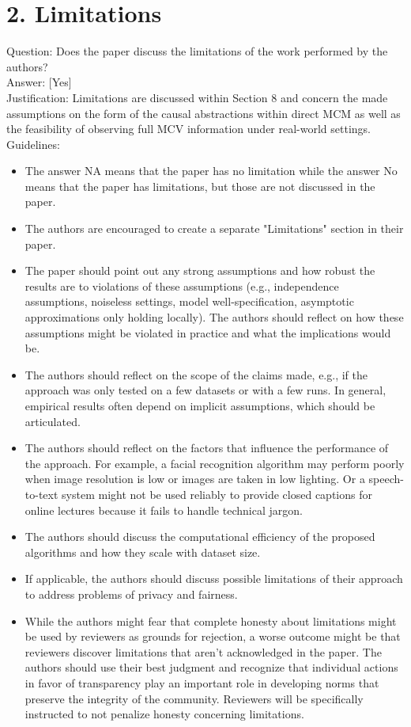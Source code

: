\documentclass[10pt]{article}
\begin{document}
\section*{2. Limitations}
Question: Does the paper discuss the limitations of the work performed by the authors?\\[0pt]
Answer: [Yes]\\
Justification: Limitations are discussed within Section 8 and concern the made assumptions on the form of the causal abstractions within direct MCM as well as the feasibility of observing full MCV information under real-world settings.\\
Guidelines:

\begin{itemize}
  \item The answer NA means that the paper has no limitation while the answer No means that the paper has limitations, but those are not discussed in the paper.
  \item The authors are encouraged to create a separate "Limitations" section in their paper.
  \item The paper should point out any strong assumptions and how robust the results are to violations of these assumptions (e.g., independence assumptions, noiseless settings, model well-specification, asymptotic approximations only holding locally). The authors should reflect on how these assumptions might be violated in practice and what the implications would be.
  \item The authors should reflect on the scope of the claims made, e.g., if the approach was only tested on a few datasets or with a few runs. In general, empirical results often depend on implicit assumptions, which should be articulated.
  \item The authors should reflect on the factors that influence the performance of the approach. For example, a facial recognition algorithm may perform poorly when image resolution is low or images are taken in low lighting. Or a speech-to-text system might not be used reliably to provide closed captions for online lectures because it fails to handle technical jargon.
  \item The authors should discuss the computational efficiency of the proposed algorithms and how they scale with dataset size.
  \item If applicable, the authors should discuss possible limitations of their approach to address problems of privacy and fairness.
  \item While the authors might fear that complete honesty about limitations might be used by reviewers as grounds for rejection, a worse outcome might be that reviewers discover limitations that aren't acknowledged in the paper. The authors should use their best judgment and recognize that individual actions in favor of transparency play an important role in developing norms that preserve the integrity of the community. Reviewers will be specifically instructed to not penalize honesty concerning limitations.
\end{itemize}
\end{document}
